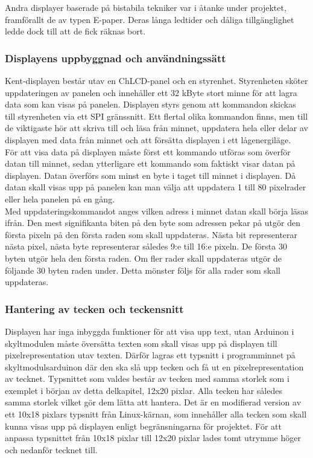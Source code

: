 \documentclass[a4paper,11pt]{article}
\begin{document}
Andra displayer baserade på bistabila tekniker var i åtanke under projektet, framförallt de av typen E-paper. Deras långa ledtider och dåliga tillgänglighet ledde dock till att de fick räknas bort.

\subsubsection{Displayens uppbyggnad och användningssätt}
Kent-displayen består utav en ChLCD-panel och en styrenhet. Styrenheten sköter uppdateringen av panelen och innehåller ett 32 kByte stort minne för att lagra data som kan visas på panelen. Displayen styrs genom att kommandon skickas till styrenheten via ett SPI gränssnitt. Ett flertal olika kommandon finns, men till de viktigaste hör att skriva till och läsa från minnet, uppdatera hela eller delar av displayen med data från minnet och att försätta displayen i ett lågenergiläge.\\

För att visa data på displayen måste först ett kommando utföras som överför datan till minnet, sedan ytterligare ett kommando som faktiskt visar datan på displayen. Datan överförs som minst en byte i taget till minnet i displayen. Då datan skall visas upp på panelen kan man välja att uppdatera 1 till 80 pixelrader eller hela panelen på en gång.\\

Med uppdateringskommandot anges vilken adress i minnet datan skall börja läsas ifrån. Den mest signifikanta biten på den byte som adressen pekar på utgör den första pixeln på den första raden som skall uppdateras. Nästa bit representerar nästa pixel, nästa byte representerar således 9:e till 16:e pixeln. De första 30 byten utgör hela den första raden. Om fler rader skall uppdateras utgör de följande 30 byten raden under. Detta mönster följs för alla rader som skall uppdateras.

\subsubsection{Hantering av tecken och teckensnitt}

Displayen har inga inbyggda funktioner för att visa upp text, utan Arduinon i skyltmodulen måste översätta texten som skall visas upp på displayen till pixelrepresentation utav texten. Därför lagras ett typsnitt i programminnet på skyltmodulsarduinon där den ska slå upp tecken och få ut en pixelrepresentation av tecknet. Typsnittet som valdes består av tecken med samma storlek som i exemplet i början av detta delkapitel, 12x20 pixlar. Alla tecken har således samma storlek vilket gör dem lätta att hantera. Det är en modifierad version av ett 10x18 pixlars typsnitt från Linux-kärnan, som innehåller alla tecken som skall kunna visas upp på displayen enligt begränsningarna för projektet. För att anpassa typsnittet från 10x18 pixlar till 12x20 pixlar lades tomt utrymme höger och nedanför tecknet till.\\
\end{document}
